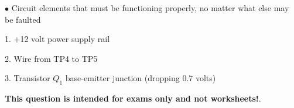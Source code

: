 \medskip
\item{$\bullet$} Circuit elements that must be functioning properly, no matter what else may be faulted
\item{1.} +12 volt power supply rail
\item{2.} Wire from TP4 to TP5
\item{3.} Transistor $Q_1$ base-emitter junction (dropping 0.7 volts)
\medskip







{\bf This question is intended for exams only and not worksheets!}.




